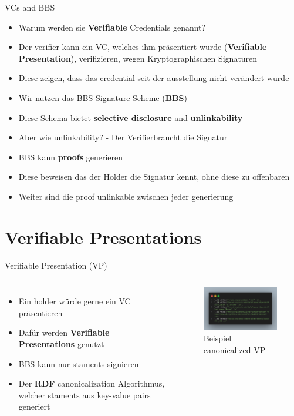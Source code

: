 \documentclass[
	german,%
	authorontitle=true,
	]{bfhbeamer}
\begin{document}
\begin{frame}{VCs and BBS}
    \begin{itemize}
        \item Warum werden sie \textbf{Verifiable} Credentials genannt?
        \item Der verifier kann ein VC, welches ihm präsentiert wurde (\textbf{Verifiable Presentation}), verifizieren, wegen Kryptographischen Signaturen
        \item Diese zeigen, dass das credential seit der ausstellung nicht verändert wurde
        \item Wir nutzen das BBS Signature Scheme (\textbf{BBS}) 
        \item Diese Schema bietet \textbf{selective disclosure} and \textbf{unlinkability}
        \item Aber wie unlinkability? - Der Verifierbraucht die Signatur
        \item BBS kann \textbf{proofs} generieren
        \item Diese beweisen das der Holder die Signatur kennt, ohne diese zu offenbaren
        \item Weiter sind die proof unlinkable zwischen jeder generierung
    \end{itemize}
\end{frame}

\section{Verifiable Presentations}

\begin{frame}{Verifiable Presentation (VP)}
    \begin{columns}[onlytextwidth,T]
        \column{70mm}  
        \begin{itemize}
            \item Ein holder würde gerne ein VC präsentieren
            \item Dafür werden \textbf{Verifiable Presentations} genutzt
            \item BBS kann nur staments signieren
            \item Der \textbf{RDF} canonicalization Algorithmus, welcher staments aus key-value pairs generiert
        \end{itemize}

        \column{70mm}

        \begin{figure}
            \centering
            \includegraphics[width=70mm]{../img/VPcanon.png}
            \caption{Beispiel canonicalized VP}
        \end{figure}

    \end{columns}
\end{frame}
\end{document}

